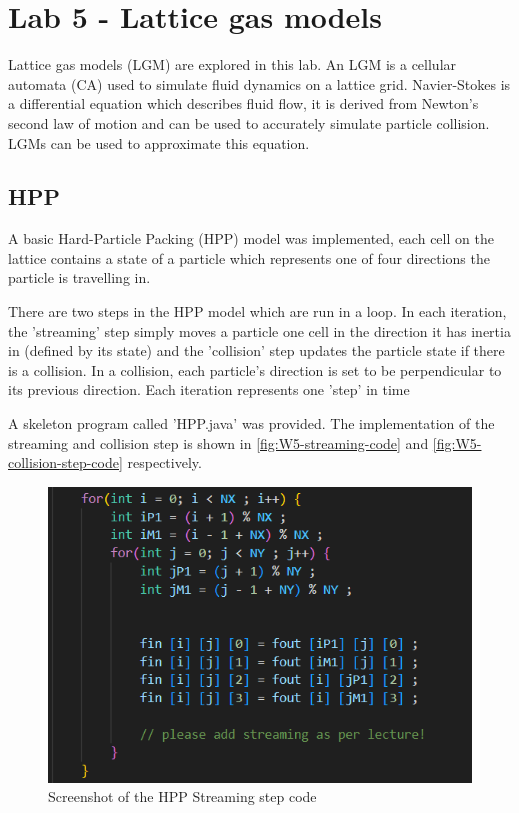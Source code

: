 \newpage
\section{Lab 5 - Lattice gas models}
Lattice gas models (LGM) are explored in this lab. An LGM is a cellular automata (CA) used to simulate fluid dynamics on a lattice grid.
Navier-Stokes is a differential equation which describes fluid flow, it is derived from Newton's second law of motion and can be used to accurately simulate particle collision. LGMs can be used to approximate this equation.


\subsection{HPP}
A basic Hard-Particle Packing (HPP) model was implemented, each cell on the lattice contains a state of a particle which represents one of four directions the particle is travelling in.

There are two steps in the HPP model which are run in a loop. In each iteration, the 'streaming' step simply moves a particle one cell in the direction it has inertia in (defined by its state) and the 'collision' step updates the particle state if there is a collision. In a collision, each particle's direction is set to be perpendicular to its previous direction. Each iteration represents one 'step' in time

A skeleton program called 'HPP.java' was provided. The implementation of the streaming and collision step is shown in \autoref{fig:W5-streaming-code} and \autoref{fig:W5-collision-step-code} respectively.


\begin{figure}[H] 
    \centering
    \includegraphics[width=0.59\columnwidth]{Figures/Week 5/HPP Streaming Step code.png}
    \caption{Screenshot of the HPP Streaming step code}
    \label{fig:W5-streaming-code}
\end{figure}

